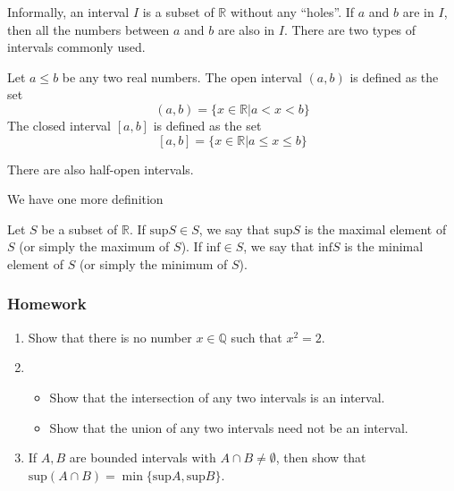 \documentclass[10pt,a4paper,oneside]{book}
\begin{document}
Informally, an interval $I$ is a subset of $\mathbb{R}$ without any ``holes''. If $a$ and $b$ are in $I$, then all the numbers between $a$ and $b$ are also in $I$. There are two types of intervals commonly used.
\begin{definition}
    Let $a\leq b$ be any two real numbers. The open interval $(a,b)$ is defined as the set 
    \[ (a,b)=\{x\in\mathbb{R}|a<x<b\} \]
    The closed interval $[a,b]$ is defined as the set
    \[ [a,b] = \{x\in \mathbb{R}|a\leq x\leq b\}\] 
\end{definition}

There are also half-open intervals.

We have one more definition
\begin{definition}
    Let $S$ be a subset of $\mathbb{R}$. If $\text{sup} S\in S$, we say that $\text{sup} S$ is the maximal element of $S$ (or simply the maximum of $S$). 
    If $\text{inf} \in S$, we say that $\text{inf} S$ is the minimal element of $S$ (or simply the minimum of $S$).
\end{definition}


\subsubsection*{Homework}

\begin{enumerate}
    \item Show that there is no number $x\in \mathbb{Q}$ such that $x^2=2$.
    \item 
    \begin{itemize}
        \item Show that the intersection of any two intervals is an interval.
        \item Show that the union of any two intervals need not be an interval.
    \end{itemize}
    \item If $A,B$ are bounded intervals with $A\cap B\neq \emptyset$, then show that $\text{sup}(A\cap B)=\min\{\text{sup}A,\text{sup}B\}$.
\end{enumerate}
\end{document}
